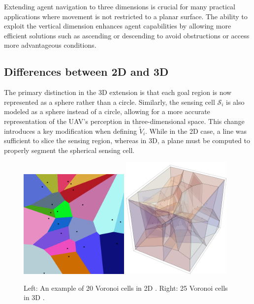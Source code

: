         Extending agent navigation to three dimensions is crucial for many practical applications where movement is not restricted to a planar surface.
        The ability to exploit the vertical dimension enhances agent capabilities by allowing more efficient solutions such as ascending or descending to avoid obstructions or access more advantageous conditions.


    \subsection{Differences between 2D and 3D}
        The primary distinction in the 3D extension is that each goal region is now represented as a sphere rather than a circle.  
        Similarly, the sensing cell $\mathcal{S}_i$ is also modeled as a sphere instead of a circle, allowing for a more accurate representation of the \ac{UAV}'s perception in three-dimensional space.  
        This change introduces a key modification when defining $\tilde{V}_i$.
        While in the 2D case, a line was sufficient to slice the sensing region, whereas in 3D, a plane must be computed to properly segment the spherical sensing cell. 
        
        \begin{figure}[H]
            \centering
            \includegraphics[width=0.48\textwidth, height=0.48\textwidth]{./fig/diagrams/Euclidean_Voronoi_diagram.jpg}
            \includegraphics[width=0.48\textwidth, height=0.48\textwidth]{./fig/diagrams/Euclidian Voronoi diagram 3d.png}
            \caption{
                Left: An example of 20 Voronoi cells in 2D \cite{Voronoi2d}. Right: 25 Voronoi cells in 3D \cite{Voronoi3d}.
            }
            \label{fig:voronoi_diagrams}
        \end{figure}
    
